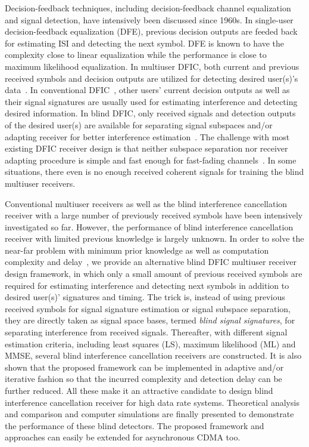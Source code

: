 \documentclass[conference]{IEEEtran}
\begin{document}
Decision-feedback techniques, including decision-feedback channel
equalization and signal detection, have intensively been discussed
since 1960s. In single-user decision-feedback equalization (DFE),
previous decision outputs are feeded back for estimating ISI and
detecting the next symbol. DFE is known to have the complexity
close to linear equalization while the performance is close to
maximum likelihood equalization. In multiuser DFIC, both current
and previous received symbols and decision outputs are utilized
for detecting desired user(s)'s data~\cite{Verd98}. In
conventional DFIC~\cite{Verd98}, other users' current decision
outputs as well as their signal signatures are usually used for
estimating interference and detecting desired information. In
blind DFIC, only received signals and detection outputs of the
desired user(s) are available for separating signal subspaces
and/or adapting receiver for better interference
estimation~\cite{Wang98}. The challenge with most existing DFIC
receiver design is that neither subspace separation nor receiver
adapting procedure is simple and fast enough for fast-fading
channels~\cite{Madh94,Wang98,Zhang02}. In some situations, there
even is no enough received coherent signals for training the blind
multiuser receivers.

Conventional multiuser receivers as well as the blind interference
cancellation receiver with a large number of previously received
symbols have been intensively investigated so far. However, the
performance of blind interference cancellation receiver with
limited previous knowledge is largely unknown. In order to solve
the near-far problem with minimum prior knowledge as well as
computation complexity and delay~\cite{Wang03d,Wang05A}, we
provide an alternative blind DFIC multiuser receiver design
framework, in which only a small amount of previous received
symbols are required for estimating interference and detecting
next symbols in addition to desired user(s)' signatures and
timing. The trick is, instead of using previous received symbols
for signal signature estimation or signal subspace separation,
they are directly taken as signal space bases, termed {\em blind
signal signatures}, for separating interference from received
signals. Thereafter, with different signal estimation criteria,
including least squares (LS), maximum likelihood (ML) and MMSE,
several blind interference cancellation receivers are constructed.
It is also shown that the proposed framework can be implemented in
adaptive and/or iterative fashion so that the incurred complexity
and detection delay can be further reduced. All these make it an
attractive candidate to design blind interference cancellation
receiver for high data rate systems. Theoretical analysis and
comparison and computer simulations are finally presented to
demonstrate the performance of these blind detectors. The proposed
framework and approaches can easily be extended for asynchronous
CDMA too.
\end{document}
